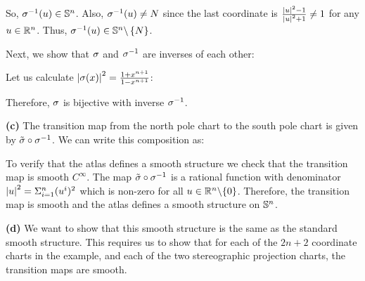 \documentclass[12pt,letterpaper]{article}
\renewcommand \paragraph[1] {\medskip \noindent \textbf{#1}}
\begin{document}
So, $\sigma^{-1}(u) \in \mathbb{S}^n$. Also, $\sigma^{-1}(u) \neq N$ since the last coordinate is $\frac{\left|u\right|^2 - 1}{\left|u\right|^2 + 1} \neq 1$ for any $u \in \mathbb{R}^n$. Thus, $\sigma^{-1}(u) \in \mathbb{S}^n \backslash \left\{N\right\}$.

Next, we show that $\sigma$ and $\sigma^{-1}$ are inverses of each other:

Let us calculate $\left|\sigma(x)\right|^2 = \frac{1 + x^{n+1}}{1 - x^{n+1}}$:

Therefore, $\sigma$ is bijective with inverse $\sigma^{-1}$.

\paragraph{(c)} The transition map from the north pole chart to the south pole chart is given by $\tilde{\sigma} \circ \sigma^{-1}$. We can write this composition as:

To verify that the atlas defines a smooth structure we check that the transition map is smooth $C^{\infty}$. The map $\tilde{\sigma} \circ \sigma^{-1}$ is a rational function with denominator $\left|u\right|^2 = \Sigma_{i=1}^n (u^i)^2$ which is non-zero for all $u \in \mathbb{R}^n \backslash \{0\}$. Therefore, the transition map is smooth and the atlas defines a smooth structure on $\mathbb{S}^n$.

\paragraph{(d)} We want to show that this smooth structure is the same as the standard smooth structure. This requires us to show that for each of the $2n+2$ coordinate charts in the example, and each of the two stereographic projection charts, the transition maps are smooth.
\end{document}
